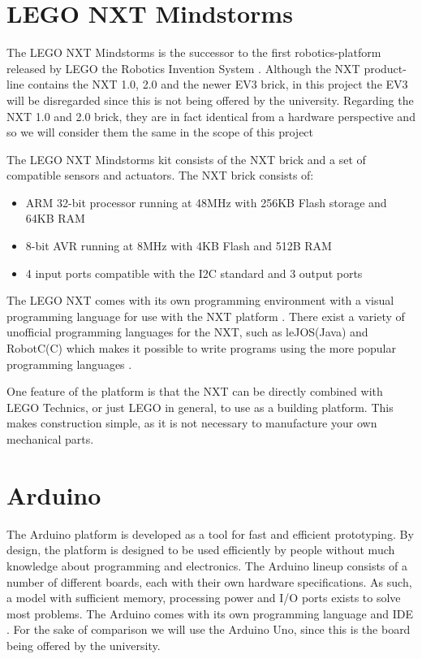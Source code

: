 \section{LEGO NXT Mindstorms}
The LEGO NXT Mindstorms is the successor to the first robotics-platform released
by LEGO the Robotics Invention System \citep{NXTHistory}. Although the NXT
product-line contains the NXT 1.0, 2.0 and the newer EV3 brick, in this project
the EV3 will be disregarded since this is not being offered by the university.
Regarding the NXT 1.0 and 2.0 brick, they are in fact identical from a hardware
perspective and so we will consider them the same in the scope of this project
\citep{NXTversions}\nl

The LEGO NXT Mindstorms kit consists of the NXT brick and a set of
compatible sensors and actuators. The NXT brick \citep[P.70]{NXTStats} consists
of:

\begin{itemize}
  \item ARM 32-bit processor running at 48MHz with 256KB Flash storage and 64KB RAM
  \item 8-bit AVR running at 8MHz with 4KB Flash and 512B RAM
  \item 4 input ports compatible with the I2C standard and 3 output ports
\end{itemize}

The LEGO NXT comes with its own programming environment with a visual
programming language for use with the NXT platform \cite{NXTG}. There exist a
variety of unofficial programming languages for the NXT, such as leJOS(Java) and
RobotC(C) which makes it possible to write programs using the more popular programming
languages \citep{NXTProgrammingLanguage}.\nl

One feature of the platform is that the NXT can be directly combined with
LEGO Technics, or just LEGO in general, to use as a building platform. This
makes construction simple, as it is not necessary to manufacture your own
mechanical parts.

\section{Arduino}
The Arduino platform is developed as a tool for fast and efficient prototyping.
By design, the platform is designed to be used efficiently by people without
much knowledge about programming and electronics. The Arduino lineup consists of
a number of different boards, each with their own hardware specifications.
As such, a model with sufficient memory, processing power and I/O
ports exists to solve most problems. The Arduino comes with its own programming
language and IDE \citep{ArduinoIntro}. For the sake of comparison we will use the Arduino Uno,
since this is the board being offered by the university.\nl

